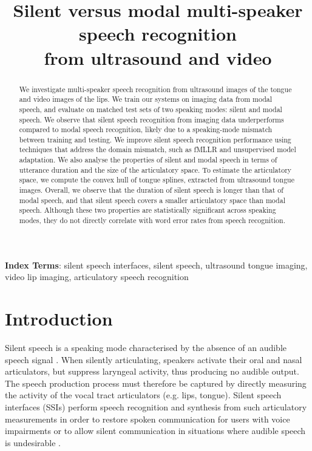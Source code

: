 \documentclass[a4paper]{article}
\title{Silent versus modal multi-speaker speech recognition \\ from ultrasound and video}
\begin{document}
\maketitle

\begin{abstract}
We investigate multi-speaker speech recognition from ultrasound images of the tongue and video images of the lips.
We train our systems on imaging data from modal speech, and evaluate on matched test sets of two speaking modes: silent and modal speech.
We observe that silent speech recognition from imaging data underperforms compared to modal speech recognition, likely due to a speaking-mode mismatch between training and testing.
We improve silent speech recognition performance using techniques that address the domain mismatch, such as fMLLR and unsupervised model adaptation.
We also analyse the properties of silent and modal speech in terms of utterance duration and the size of the articulatory space.
To estimate the articulatory space, we compute the convex hull of tongue splines, extracted from ultrasound tongue images.
Overall, we observe that the duration of silent speech is longer than that of modal speech, and that silent speech covers a smaller articulatory space than modal speech.
Although these two properties are statistically significant across speaking modes, they do not directly correlate with word error rates from speech recognition.
\end{abstract}
\noindent\textbf{Index Terms}: silent speech interfaces, silent speech, ultrasound tongue imaging, video lip imaging, articulatory speech recognition

\section{Introduction}

Silent speech is a speaking mode characterised by the absence of an audible speech signal \cite{schultz2017biosignal}.
When silently articulating, speakers activate their oral and nasal articulators, but suppress laryngeal activity, thus producing no audible output.
The speech production process must therefore be captured by directly measuring the activity of the vocal tract articulators (e.g. lips, tongue).
Silent speech interfaces (SSIs) perform speech recognition and synthesis from such articulatory measurements in order to restore spoken communication for users with voice impairments or to allow silent communication in situations where audible speech is undesirable \cite{denby2010silent}.
\end{document}
